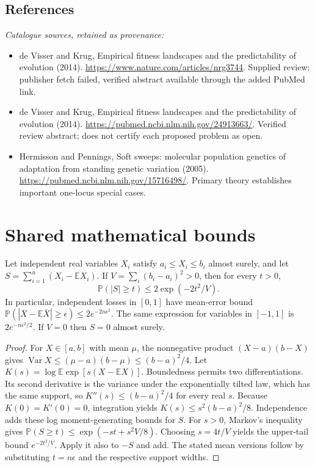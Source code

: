 \documentclass[11pt]{article}
\begin{document}
\subsection{References}
\noindent\emph{Catalogue sources, retained as provenance:}
\begin{itemize}
\item de Visser and Krug, Empirical fitness landscapes and the predictability of evolution (2014). \url{https://www.nature.com/articles/nrg3744}. Supplied review; publisher fetch failed, verified abstract available through the added PubMed link.
\item de Visser and Krug, Empirical fitness landscapes and the predictability of evolution (2014). \url{https://pubmed.ncbi.nlm.nih.gov/24913663/}. Verified review abstract; does not certify each proposed problem as open.
\item Hermisson and Pennings, Soft sweeps: molecular population genetics of adaptation from standing genetic variation (2005). \url{https://pubmed.ncbi.nlm.nih.gov/15716498/}. Primary theory establishes important one-locus special cases.
\end{itemize}




\section{Shared mathematical bounds}\label{app:bounds}
\begin{lemma}\label{lem:bounded}
Let independent real variables $X_i$ satisfy $a_i\leq X_i\leq b_i$ almost surely,
and let $S=\sum_{i=1}^n(X_i-\mathbb{E} X_i)$. If
$V=\sum_i(b_i-a_i)^2>0$, then for every $t>0$,
\[
 \mathbb{P}(|S|\geq t)\leq 2\exp(-2t^2/V).
\]
In particular, independent losses in $[0,1]$ have mean-error bound
$\mathbb{P}(|\overline X-\mathbb{E}\overline X|\geq\epsilon)
\leq2e^{-2n\epsilon^2}$. The same expression for variables in $[-1,1]$
is $2e^{-n\epsilon^2/2}$. If $V=0$ then $S=0$ almost surely.
\end{lemma}
\begin{proof}
For $X\in[a,b]$ with mean $\mu$, the nonnegative product
$(X-a)(b-X)$ gives
$\operatorname{Var} X\leq(\mu-a)(b-\mu)\leq(b-a)^2/4$.
Let $K(s)=\log\mathbb{E}\exp[s(X-\mathbb{E} X)]$.
Boundedness permits two differentiations. Its second derivative is the variance
under the exponentially tilted law, which has the same support, so
$K''(s)\leq(b-a)^2/4$ for every real $s$.
Because $K(0)=K'(0)=0$, integration yields
$K(s)\leq s^2(b-a)^2/8$.
Independence adds these log moment-generating bounds for $S$.
For $s>0$, Markov's inequality gives
$\mathbb{P}(S\geq t)\leq\exp(-st+s^2V/8)$.
Choosing $s=4t/V$ yields the upper-tail bound $e^{-2t^2/V}$.
Apply it also to $-S$ and add. The stated mean versions follow by substituting
$t=n\epsilon$ and the respective support widths.
\end{proof}
\end{document}
